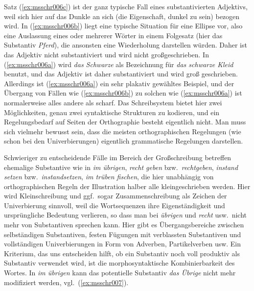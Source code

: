 \begin{exe}
  \ex\label{ex:msschr006} 
  \begin{xlist}
  \end{xlist}
\end{exe}

Satz (\ref{ex:msschr006c}) ist der ganz typische Fall eines substantivierten Adjektivs, weil sich hier auf das Dunkle an sich (die Eigenschaft, dunkel zu sein) bezogen wird.
In (\ref{ex:msschr006b}) liegt eine typische Situation für eine Ellipse vor, also eine Auslassung eines oder mehrerer Wörter in einem Folgesatz (hier das Substantiv \textit{Pferd}), die ansonsten eine Wiederholung darstellen würden.
Daher ist das Adjektiv nicht substantiviert und wird nicht großgeschrieben.
In (\ref{ex:msschr006a}) wird \textit{das Schwarze} als Bezeichnung für \textit{das schwarze Kleid} benutzt, und das Adjektiv ist daher substantiviert und wird groß geschrieben.
Allerdings ist (\ref{ex:msschr006a}) ein sehr plakativ gewähltes Beispiel, und der Übergang von Fällen wie (\ref{ex:msschr006b}) zu solchen wie (\ref{ex:msschr006a}) ist normalerweise alles andere als scharf.
Das Schreibsystem bietet hier zwei Möglichkeiten, genau zwei syntaktische Strukturen zu kodieren, und ein Regelungsbedarf auf Seiten der Orthographie besteht eigentlich nicht.
Man muss sich vielmehr bewusst sein, dass die meisten orthographischen Regelungen (wie schon bei den Univerbierungen) eigentlich grammatische Regelungen darstellen.

Schwieriger zu entscheidende Fälle im Bereich der Großschreibung betreffen ehemalige Substantive wie in \textit{im übrigen}, \textit{recht geben} bzw.\ \textit{rechtgeben}, \textit{instand setzen} bzw.\ \textit{instandsetzen}, \textit{im trüben fischen}, die hier unabhängig von orthographischen Regeln der Illustration halber alle kleingeschrieben werden.
Hier wird Kleinschreibung und ggf.\ sogar Zusammenschreibung als Zeichen der Univerbierung sinnvoll, weil die Wortsequenzen ihre Eigenständigkeit und ursprüngliche Bedeutung verlieren, so dass man bei \textit{übrigen} und \textit{recht} usw.\ nicht mehr von Substantiven sprechen kann.
Hier gibt es Übergangsbereiche zwischen selbständigen Substantiven, festen Fügungen mit verblassten Substantiven und vollständigen Univerbierungen in Form von Adverben, Partikelverben usw.
Ein Kriterium, das uns entscheiden hilft, ob ein Substantiv noch voll produktiv als Substantiv verwendet wird, ist die morphosyntaktische Kombinierbarkeit des Wortes.
In \textit{im übrigen} kann \zB das potentielle Substantiv \textit{das Übrige} \zB nicht mehr modifiziert werden, vgl.\ (\ref{ex:msschr007}).

